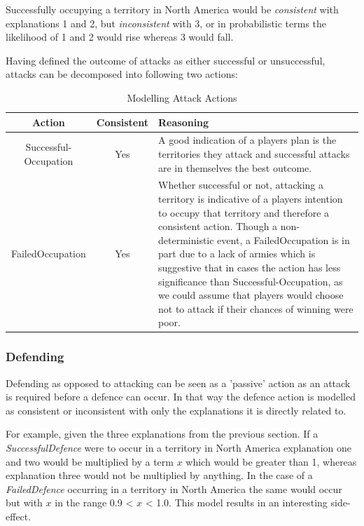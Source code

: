 \documentclass[parskip]{cs4rep}
\begin{document}
Successfully occupying a territory in North America would be \textit{consistent} with explanations 1 and 2, but \textit{inconsistent} with 3, or in probabilistic terms the likelihood of 1 and 2 would rise whereas 3 would fall.

Having defined the outcome of attacks as either successful or unsuccessful, attacks can be decomposed into following two actions: 

\begin{table}[ht]
\centering
\begin{tabular}{|c|c|p{8cm}|}
\hline 
\textbf{Action} & \textbf{Consistent}  & \textbf{Reasoning} \\ 
\hline 
Successful-Occupation & Yes & A good indication of a players plan is the territories they attack and successful attacks are in themselves the best outcome. \\ 
\hline 
FailedOccupation & Yes & Whether successful or not, attacking a territory is indicative of a players intention to occupy that territory and therefore a consistent action. Though a non-deterministic event, a FailedOccupation is in part due to a lack of armies which is suggestive that in cases the action has less significance than Successful-Occupation, as we could assume that players would choose not to attack if their chances of winning were poor.\\ 
\hline
\end{tabular}
\caption{Modelling Attack Actions}
\label{table:attack-modelling}
\end{table}

\newpage

\subsubsection{Defending}

Defending as opposed to attacking can be seen as a 'passive' action as an attack is required before a defence can occur. In that way the defence action is modelled as consistent or inconsistent with only the explanations it is directly related to. 

For example, given the three explanations from the previous section. If a \textit{SuccessfulDefence} were to occur in a territory in North America explanation one and two would be multiplied by a term $x$ which would be greater than 1, whereas explanation three would not be multiplied by anything. In the case of a \textit{FailedDefence} occurring in a territory in North America the same would occur but with $x$ in the range 0.9 < $x$ < 1.0. This model results in an interesting side-effect.
\end{document}
